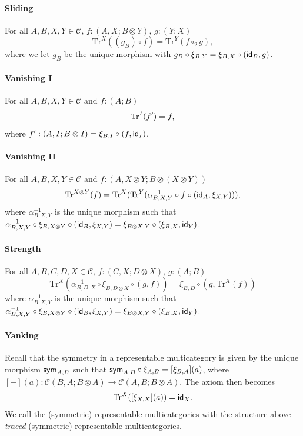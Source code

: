 \paragraph{Sliding} For all $A,B,X,Y \in \mathcal{C}$, $f : (A,X;B \otimes Y)$, $g : (Y;X)$
\[
\text{Tr}^{X}((g_{B}) \circ f) = \text{Tr}^{Y}(f \circ_2 g),
\]
where we let $g_{B}$ be the unique morphism with $g_{B} \circ \xi_{B,Y} = \xi_{B,X} \circ (\textsf{id}_{B}, g)$.
\paragraph{Vanishing I} For all $A,B,X,Y \in \mathcal{C}$ and $f : (A;B)$
\[
\text{Tr}^{I}(f') = f,
\]
where $f' : (A,I; B \otimes I) = \xi_{B,I} \circ (f, \textsf{id}_{I})$.

\paragraph{Vanishing II} For all $A,B,X,Y \in \mathcal{C}$ and $f : (A,X \otimes Y;B \otimes (X \otimes Y))$
\[
\text{Tr}^{X \otimes Y}(f) = \text{Tr}^{X}(\text{Tr}^{Y}(\alpha_{B,X,Y}^{-1} \circ f \circ (\textsf{id}_{A}, \xi_{X,Y}))),
\]
where $\alpha_{B,X,Y}^{-1}$ is the unique morphism such that $\alpha_{B,X,Y}^{-1} \circ \xi_{B,X \otimes Y} \circ (\textsf{id}_{B}, \xi_{X,Y}) = \xi_{B \otimes X, Y} \circ (\xi_{B,X}, \textsf{id}_{Y})$. 
\paragraph{Strength} For all $A,B,C,D,X \in \mathcal{C}$, $f : (C,X;D \otimes X)$, $g : (A;B)$
\[
\text{Tr}^{X}(\alpha_{B,D,X}^{-1} \circ \xi_{B, D \otimes X} \circ (g,f)) = \xi_{B,D} \circ (g, \text{Tr}^{X}(f))
\]
where $\alpha_{B,X,Y}^{-1}$ is the unique morphism such that $\alpha_{B,X,Y}^{-1} \circ \xi_{B,X \otimes Y} \circ (\textsf{id}_{B}, \xi_{X,Y}) = \xi_{B \otimes X, Y} \circ (\xi_{B,X}, \textsf{id}_{Y})$. 
\paragraph{Yanking} Recall that the symmetry in a representable multicategory is given by the unique morphism $\textsf{sym}_{A,B}$ such that $\textsf{sym}_{A,B} \circ \xi_{A,B} = [\xi_{B,A}](a)$, where $[-](a) : \mathcal{C}(B,A; B \otimes A) \to \mathcal{C}(A,B; B \otimes A)$.
The axiom then becomes
\[
\text{Tr}^{X}([\xi_{X,X}](a)) = \textsf{id}_{X}.
\]
We call the (symmetric) representable multicategories with the structure above \emph{traced} (symmetric) representable multicategories.

